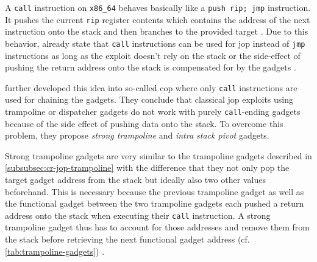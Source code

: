 A \texttt{call} instruction on \texttt{x86\_64} behaves basically like a \texttt{push rip; jmp} instruction.
It pushes the current \texttt{rip} register contents which contains the address of the next instruction onto the stack and then branches to the provided target \cite[3-122\psqq]{IntelCorporation2020}.
Due to this behavior, \citeauthor{Bletsch2011} already state that \texttt{call} instructions can be used for \gls{jop} instead of \texttt{jmp} instructions as long as the exploit doesn't rely on the stack or the side-effect of pushing the return address onto the stack is compensated for by the gadgets \cite{Bletsch2011}.

\citeauthor{Sadeghi2018} further developed this idea into so-called \gls{cop} where only \texttt{call} instructions are used for chaining the gadgets.
They conclude that classical \gls{jop} exploits using trampoline or dispatcher gadgets do not work with purely \texttt{call}-ending gadgets because of the side effect of pushing data onto the stack.
To overcome this problem, they propose \emph{strong trampoline} and \emph{intra stack pivot} gadgets.

Strong trampoline gadgets are very similar to the trampoline gadgets described in \cref{subsubsec:cr-jop-trampoline} with the difference that they not only pop the target gadget address from the stack but ideally also two other values beforehand.
This is necessary because the previous trampoline gadget as well as the functional gadget between the two trampoline gadgets each pushed a return address onto the stack when executing their \texttt{call} instruction.
A strong trampoline gadget thus has to account for those addresses and remove them from the stack before retrieving the next functional gadget address (cf. \cref{tab:trampoline-gadgets}) \cite{Sadeghi2018}.

 \begin{table}[ht]
	\centering
	\caption{Comparison between exemplary trampoline gadget as in \cite{Checkoway2010} and strong trampoline gadget as in \cite{Sadeghi2018}}
	\label{tab:trampoline-gadgets}
\end{table}

